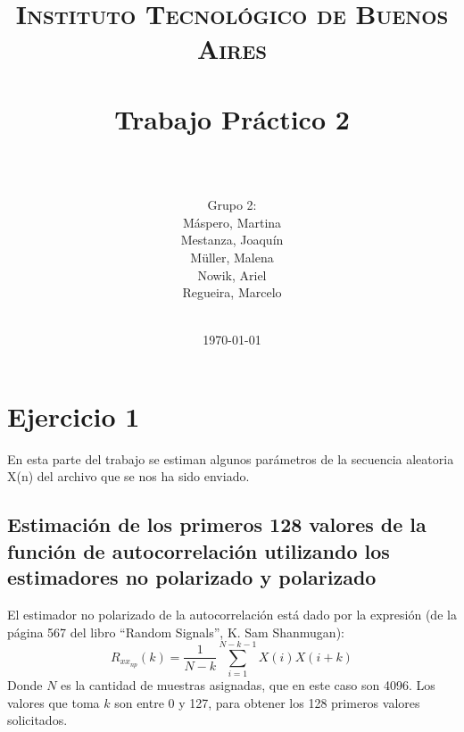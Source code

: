 
\usepackage[utf8x]{inputenc}





\title{
	\normalfont \normalsize \textsc{Instituto Tecnológico de Buenos Aires} \\ [25pt]
	\horrule{2pt} \\[0.4cm]
	\huge Trabajo Pr\'actico 2\\
	\horrule{2pt} \\[0cm]
\author{Grupo 2:\\M\'aspero, Martina \\Mestanza, Joaqu\'in\\ Müller, Malena\\Nowik, Ariel\\Regueira, Marcelo\\ \\ }
}
\date{\today} 

\maketitle
\newpage

\section*{Ejercicio 1}

En esta parte del trabajo se estiman algunos par\'ametros de la secuencia aleatoria X(n) del archivo que se nos ha sido enviado.

\subsection{Estimaci\'on de los primeros 128 valores de la funci\'on de autocorrelaci\'on utilizando los estimadores no polarizado y polarizado}

El estimador no polarizado de la autocorrelación está dado por la expresión (de la página 567 del libro ``Random Signals'', K. Sam Shanmugan):
$$R_{xx_{np}}(k) = \frac{1}{N - k} \sum_{i=1}^{N-k-1}X(i)X(i+k)$$
Donde $N$ es la cantidad de muestras asignadas, que en este caso son 4096. Los valores que toma $k$ son entre 0 y 127, para obtener los 128 primeros valores solicitados.\par

